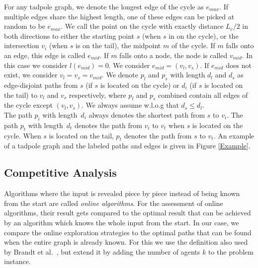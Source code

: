 For any tadpole graph, we denote the longest edge of the cycle as $e_{max}$. If multiple edges share the highest length, one of these edges can be picked at random
to be $e_{max}$. We call the point on the cycle with exactly distance $L_c/2$ in both directions to either
the starting point $s$ (when $s$ in on the cycle), or the intersection $v_i$ (when $s$ is on the tail), the midpoint $m$ of the cycle. If $m$ falls onto an edge, this edge is
called $e_{mid}$. If $m$ falls onto a node, the node is called $v_{mid}$. In this case we consider $l(e_{mid}) = 0$.
We consider $e_{mid}=(v_l, v_s)$. If $e_{mid}$ does
not exist, we consider $v_l = v_s = v_{mid}$. 
We denote $p_l$ and $p_s$ with length $d_l$ and $d_s$ as edge-disjoint paths from $s$ (if $s$ is located on the cycle) or $d_i$ (if $s$ is located on the tail) to $v_l$ and $v_s$ respectively, 
where $p_l$ and $p_s$ combined contain all edges of the cycle except $(v_l, v_s)$. We always assume w.l.o.g that $d_s \leq d_l$.\\
The path $p_i$ with length~$d_i$ always denotes the shortest path from $s$ to $v_i$. 
The path $p_t$ with length~$d_t$ denotes the path from $v_i$ to $v_t$ when $s$ is located on the cycle. When $s$ is located on the tail, $p_t$ denotes the path from $s$
to $v_t$. An example of a tadpole graph and the labeled paths and edges is given in Figure \ref{Example}.

\subsection{Competitive Analysis}\label{competitive}
Algorithms where the input is revealed piece by piece instead of being known from the start are called \textit{online algorithms}. For the assessment of online algorithms,
their result gets compared to the optimal result that can be achieved by an algorithm which knows the whole input from the start. In our case, we compare the online
exploration strategies to the optimal paths that can be found when the entire graph is already known. For this we use the definition also used by Brandt et al.~\cite{Brandt2020}, but extend it
by adding the number of agents $k$ to the problem instance.

